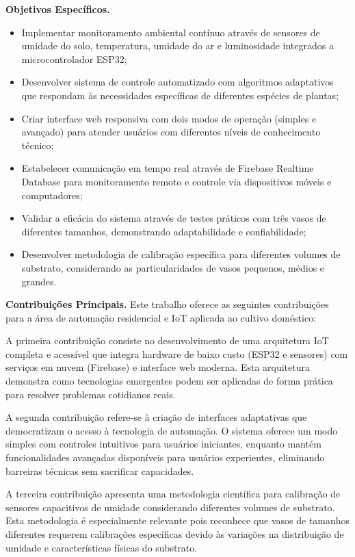 \documentclass[twoside,english,brazilian]{UNISINOSmonografia}
\begin{document}
\medskip
\noindent\textbf{Objetivos Específicos.}
\begin{itemize}
    \item Implementar monitoramento ambiental contínuo através de sensores de umidade do solo, temperatura, umidade do ar e luminosidade integrados a microcontrolador ESP32;
    \item Desenvolver sistema de controle automatizado com algoritmos adaptativos que respondam às necessidades específicas de diferentes espécies de plantas;
    \item Criar interface web responsiva com dois modos de operação (simples e avançado) para atender usuários com diferentes níveis de conhecimento técnico;
    \item Estabelecer comunicação em tempo real através de Firebase Realtime Database para monitoramento remoto e controle via dispositivos móveis e computadores;
    \item Validar a eficácia do sistema através de testes práticos com três vasos de diferentes tamanhos, demonstrando adaptabilidade e confiabilidade;
    \item Desenvolver metodologia de calibração específica para diferentes volumes de substrato, considerando as particularidades de vasos pequenos, médios e grandes.
\end{itemize}

\noindent\textbf{Contribuições Principais.} Este trabalho oferece as seguintes contribuições para a área de automação residencial e IoT aplicada ao cultivo doméstico:

A primeira contribuição consiste no desenvolvimento de uma arquitetura IoT completa e acessível que integra hardware de baixo custo (ESP32 e sensores) com serviços em nuvem (Firebase) e interface web moderna. Esta arquitetura demonstra como tecnologias emergentes podem ser aplicadas de forma prática para resolver problemas cotidianos reais.

A segunda contribuição refere-se à criação de interfaces adaptativas que democratizam o acesso à tecnologia de automação. O sistema oferece um modo simples com controles intuitivos para usuários iniciantes, enquanto mantém funcionalidades avançadas disponíveis para usuários experientes, eliminando barreiras técnicas sem sacrificar capacidades.

A terceira contribuição apresenta uma metodologia científica para calibração de sensores capacitivos de umidade considerando diferentes volumes de substrato. Esta metodologia é especialmente relevante pois reconhece que vasos de tamanhos diferentes requerem calibrações específicas devido às variações na distribuição de umidade e características físicas do substrato.
\end{document}
